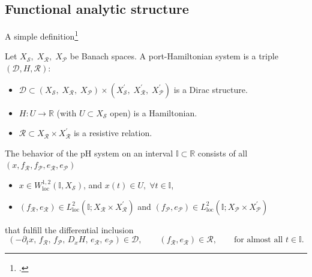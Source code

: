 \documentclass[aspectratio=169]{beamer}
\newcommand{\bbR}{\mathbb{R}}
\newcommand{\bbI}{\mathbb{I}}
\begin{document}
\subsection{Functional analytic structure}

\begin{frame}{A simple definition\footcite{reis2021pH}}
	\begin{definition}
		Let $X_\mathcal{S}, \; X_\mathcal{R}, \; {X}_{\mathcal{P}}$ be Banach spaces. A port-Hamiltonian system is a triple $(\mathcal{D}, H, \mathcal{R})$:
		\begin{itemize}
			\item $\mathcal{D} \subset (X_\mathcal{S}, \; X_\mathcal{R}, \; X_\mathcal{P}) \times (X^{'}_\mathcal{S}, \; X^{'}_\mathcal{R}, \; X^{'}_\mathcal{P})$ is a Dirac structure.
			\item ${H} : U \rightarrow \bbR$ (with $U \subset X_\mathcal{S}$ open) is a Hamiltonian.
			\item $\mathcal{R}\subset X_\mathcal{R} \times X_{\mathcal{R}}^{'}$ is a resistive relation.
		\end{itemize}
		The behavior of the pH system on an interval $\mathbb{I} \subset \bbR$ consists of all $(x, f_{\mathcal{R}}, f_{\mathcal{P}} , e_{\mathcal{R}}, e_{\mathcal{P}})$
		\begin{itemize}
			\item 	$x \in W^{1,2}_{\text{loc}}(\mathbb{I}, X_{\mathcal{S}})$, and $x(t) \in U, \; \forall t \in \bbI$, 
			\item $(f_\mathcal{R}, e_\mathcal{R}) \in L^2_{\text{loc}}(\bbI; X_{\mathcal{R}} \times X^{'}_{\mathcal{R}})$ and $(f_\mathcal{P}, e_\mathcal{P}) \in L^2_{\text{loc}}(\bbI; X_{\mathcal{P}} \times X^{'}_{\mathcal{P}})$
		\end{itemize}
		that fulfill the differential inclusion
		\begin{equation*}
			(-\partial_t x,\, f_{\mathcal{R}},\, f_{\mathcal{P}},\, D_x {H},\, e_{\mathcal{R}},\, e_{\mathcal{P}}) \in \mathcal{D}, \qquad (f_\mathcal{R}, e_\mathcal{R}) \in \mathcal{R}, \qquad \text{for almost all } t \in \bbI.
		\end{equation*}
	\end{definition}
\end{frame}
\end{document}
